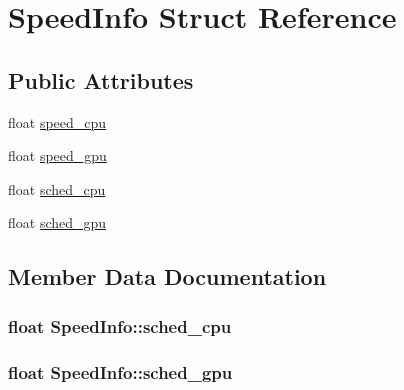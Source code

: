 \hypertarget{struct_speed_info}{}\section{Speed\+Info Struct Reference}
\label{struct_speed_info}
\subsection*{Public Attributes}
\begin{DoxyCompactItemize}
\item 
float \hyperlink{struct_speed_info_a083482c754c5ab95f6f25238610f803c}{speed\+\_\+cpu}
\item 
float \hyperlink{struct_speed_info_aaa8f95513c3132d321801bfff20f11a4}{speed\+\_\+gpu}
\item 
float \hyperlink{struct_speed_info_a847cb8b35291af8f0f3bfa1b1bd888d0}{sched\+\_\+cpu}
\item 
float \hyperlink{struct_speed_info_a9703e36873f697d0157eb318c1316fba}{sched\+\_\+gpu}
\end{DoxyCompactItemize}


\subsection{Member Data Documentation}
\subsubsection[{\texorpdfstring{sched\+\_\+cpu}{sched_cpu}}]{\setlength{\rightskip}{0pt plus 5cm}float Speed\+Info\+::sched\+\_\+cpu}\hypertarget{struct_speed_info_a847cb8b35291af8f0f3bfa1b1bd888d0}{}\label{struct_speed_info_a847cb8b35291af8f0f3bfa1b1bd888d0}
\subsubsection[{\texorpdfstring{sched\+\_\+gpu}{sched_gpu}}]{\setlength{\rightskip}{0pt plus 5cm}float Speed\+Info\+::sched\+\_\+gpu}\hypertarget{struct_speed_info_a9703e36873f697d0157eb318c1316fba}{}\label{struct_speed_info_a9703e36873f697d0157eb318c1316fba}
